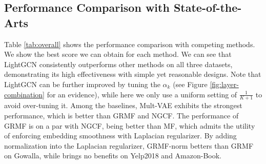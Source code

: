 
\subsection{Performance Comparison with State-of-the-Arts}\label{ss:exp-SOTA}
Table \ref{tab:overall} shows the performance comparison with competing methods. We show the best score we can obtain for each method. We can see that LightGCN consistently outperforms other methods on all three datasets, demonstrating its high effectiveness with simple yet reasonable designs. Note that LightGCN can be further improved by tuning the $\alpha_k$ (see Figure \ref{fig:layer-combination} for an evidence), while here we only use a uniform setting of $\frac{1}{K+1}$ to avoid over-tuning it. Among the baselines, Mult-VAE exhibits the strongest performance, which is better than GRMF and NGCF. 
The performance of GRMF is on a par with NGCF, being better than MF, which admits the utility of enforcing embedding smoothness with Laplacian regularizer. 
By adding normalization into the Laplacian regularizer, GRMF-norm betters than GRMF on Gowalla, while brings no benefits on Yelp2018 and Amazon-Book. 



\begin{table}[h]
\caption{The comparison of overall performance among LightGCN and competing methods.}\vspace{-8pt}
\label{tab:overall}
\end{table}

